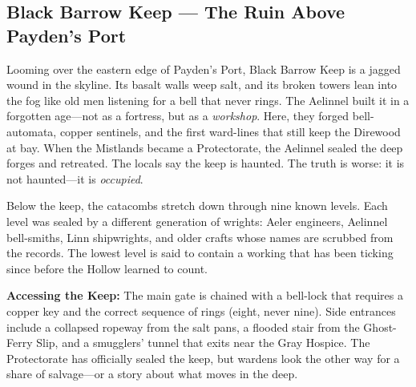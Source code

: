 \subsection*{Black Barrow Keep --- The Ruin Above Payden's Port}
\label{sec:black-barrow}

Looming over the eastern edge of Payden's Port, Black Barrow Keep is a jagged wound in the skyline. Its basalt walls weep salt, and its broken towers lean into the fog like old men listening for a bell that never rings. The Aelinnel built it in a forgotten age---not as a fortress, but as a \emph{workshop}. Here, they forged bell-automata, copper sentinels, and the first ward-lines that still keep the Direwood at bay. When the Mistlands became a Protectorate, the Aelinnel sealed the deep forges and retreated. The locals say the keep is haunted. The truth is worse: it is not haunted---it is \emph{occupied}.

Below the keep, the catacombs stretch down through nine known levels. Each level was sealed by a different generation of wrights: Aeler engineers, Aelinnel bell-smiths, Linn shipwrights, and older crafts whose names are scrubbed from the records. The lowest level is said to contain a working that has been ticking since before the Hollow learned to count.

\textbf{Accessing the Keep:} The main gate is chained with a bell-lock that requires a copper key and the correct sequence of rings (eight, never nine). Side entrances include a collapsed ropeway from the salt pans, a flooded stair from the Ghost-Ferry Slip, and a smugglers' tunnel that exits near the Gray Hospice. The Protectorate has officially sealed the keep, but wardens look the other way for a share of salvage---or a story about what moves in the deep.


